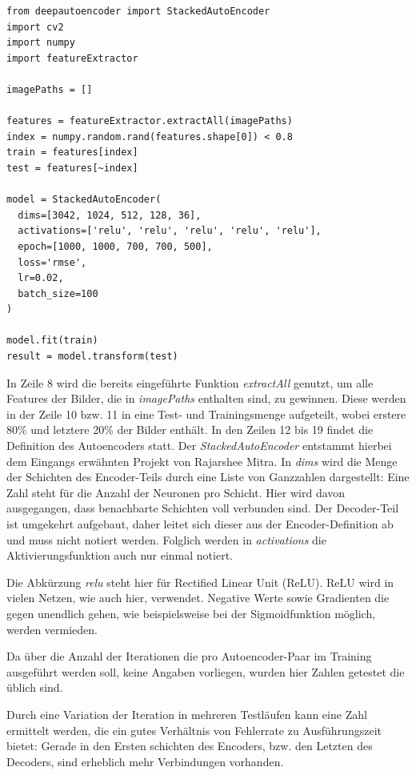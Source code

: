 \lstset{language=Python}
\begin{lstlisting}
from deepautoencoder import StackedAutoEncoder
import cv2
import numpy
import featureExtractor

imagePaths = []

features = featureExtractor.extractAll(imagePaths)
index = numpy.random.rand(features.shape[0]) < 0.8
train = features[index]
test = features[~index]

model = StackedAutoEncoder(
  dims=[3042, 1024, 512, 128, 36],
  activations=['relu', 'relu', 'relu', 'relu', 'relu'], 
  epoch=[1000, 1000, 700, 700, 500], 
  loss='rmse', 
  lr=0.02, 
  batch_size=100
)

model.fit(train)
result = model.transform(test)
\end{lstlisting}

In Zeile 8 wird die bereits eingeführte Funktion \textit{extractAll} genutzt, um alle Features der Bilder, die in \textit{imagePaths} enthalten sind, zu gewinnen. Diese werden in der Zeile 10 bzw. 11 in eine Test- und Trainingsmenge aufgeteilt, wobei erstere 80\% und letztere 20\% der Bilder enthält.
In den Zeilen 12 bis 19 findet die Definition des Autoencoders statt. Der \textit{StackedAutoEncoder} entstammt hierbei dem Eingangs erwähnten Projekt von Rajarshee Mitra. In \textit{dims} wird die Menge der Schichten des Encoder-Teils durch eine Liste von Ganzzahlen dargestellt: Eine Zahl steht für die Anzahl der Neuronen pro Schicht. Hier wird davon ausgegangen, dass benachbarte Schichten voll verbunden sind. Der Decoder-Teil ist umgekehrt aufgebaut, daher leitet sich dieser aus der Encoder-Definition ab und muss nicht notiert werden. Folglich werden in \textit{activations} die Aktivierungsfunktion auch nur einmal notiert. 

Die Abkürzung \textit{relu} steht hier für Rectified Linear Unit (ReLU). ReLU wird in vielen Netzen, wie auch hier, verwendet. Negative Werte sowie Gradienten die gegen unendlich gehen, wie beispielsweise bei der Sigmoidfunktion möglich, werden vermieden. 

Da über die Anzahl der Iterationen die pro Autoencoder-Paar im Training ausgeführt werden soll, keine Angaben vorliegen, wurden hier Zahlen getestet die üblich sind. 

Durch eine Variation der Iteration in mehreren Testläufen kann eine Zahl ermittelt werden, die ein gutes Verhältnis von Fehlerrate zu Ausführungszeit bietet: Gerade in den Ersten schichten des Encoders, bzw. den Letzten des Decoders, sind erheblich mehr Verbindungen vorhanden. 

